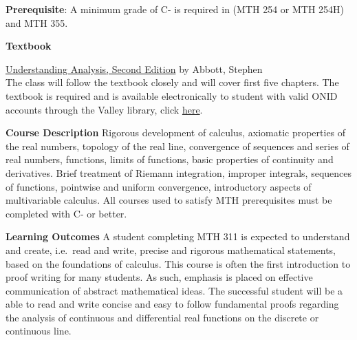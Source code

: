 \documentclass{article}
\begin{document}
\bigskip

\noindent \textbf{Prerequisite}:
A minimum grade of C- is required in (MTH 254 or MTH 254H) and MTH 355.

\bigskip

\noindent \textbf{Textbook}

\href{https://www.springer.com/us/book/9781493927111?gclid=Cj0KCQiAr8bwBRD4ARIsAHa4YyKFsQG7Lh8btaedOrsSl1kO4wzCDyS36owaXKVTbMPXB7gwZdOc0r4aAnShEALw_wcB}{Understanding Analysis, Second Edition}
by Abbott, Stephen\\
The class will follow the textbook closely and will cover first five chapters. The textbook is required and is available electronically to student with valid ONID accounts through the Valley library, click \href{https://search.library.oregonstate.edu/primo-explore/fulldisplay?docid=CP71228341450001451&vid=OSU&search_scope=everything&tab=default_tab&lang=en_US&context=L}{here}.

\bigskip

\noindent \textbf{Course Description}
Rigorous development of calculus, axiomatic properties of the real numbers, topology of the real line, convergence of sequences and series of real numbers, functions, limits of functions, basic properties of continuity and derivatives. Brief treatment of Riemann integration, improper integrals, sequences of functions, pointwise and uniform convergence, introductory aspects of multivariable calculus. All courses used to satisfy MTH prerequisites must be completed with C- or better.

\bigskip

\noindent \textbf{Learning Outcomes}
A student completing MTH 311 is expected to understand and create, i.e.~read and write, precise and rigorous mathematical statements, based on the foundations of calculus. This course is often the first introduction to proof writing for many students. As such, emphasis is placed on effective communication of abstract mathematical ideas. The successful student will be a able to read and write concise and easy to follow fundamental proofs regarding the analysis of continuous and differential real functions on the discrete or continuous line.


\end{document}
